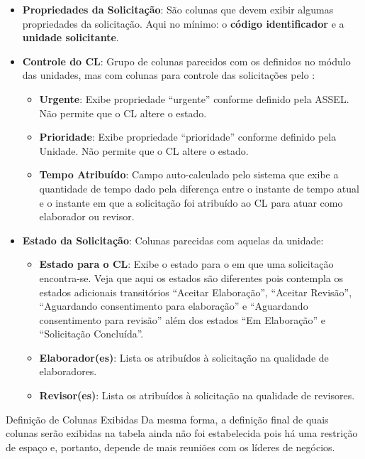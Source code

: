 \begin{itemize}
	\item \textbf{Propriedades da Solicitação}: São colunas que devem exibir algumas propriedades da solicitação. Aqui no mínimo: o \textbf{código identificador} e a \textbf{unidade solicitante}.
	
	
	\item \textbf{Controle do CL}: Grupo de colunas parecidos com os definidos no módulo das unidades, mas com colunas para controle das solicitações pelo \CL:
	
	\begin{itemize}
		\item \textbf{Urgente}: Exibe propriedade ``urgente'' conforme definido pela ASSEL. Não permite que o CL altere o estado. 
		
		\item \textbf{Prioridade}: Exibe propriedade ``prioridade'' conforme definido pela Unidade. Não permite que o CL altere o estado.
		
		\item \textbf{Tempo Atribuído}: Campo auto-calculado pelo sistema que exibe a quantidade de tempo dado pela diferença entre o instante de tempo atual e o instante em que a solicitação foi atribuído ao CL para atuar como elaborador ou revisor.
	\end{itemize}
	
	\item \textbf{Estado da Solicitação}: Colunas parecidas com aquelas da unidade:
	\begin{itemize}
		\item \textbf{Estado para o CL}: Exibe o estado para o \CL em que uma solicitação encontra-se. Veja que aqui os estados são diferentes pois contempla os estados adicionais transitórios ``Aceitar Elaboração'', ``Aceitar Revisão'', ``Aguardando consentimento para elaboração'' e ``Aguardando consentimento para revisão'' além dos estados ``Em Elaboração'' e ``Solicitação Concluída''.
		
		\item \textbf{Elaborador(es)}: Lista os \CLs atribuídos à solicitação na qualidade de elaboradores.
		
		\item \textbf{Revisor(es)}: Lista os \CLs atribuídos à solicitação na qualidade de revisores.
	\end{itemize}
\end{itemize}


\begin{nota}{Definição de Colunas Exibidas}
	Da mesma forma, a definição final de quais colunas serão exibidas na tabela ainda não foi estabelecida pois há uma restrição de espaço e, portanto, depende de mais reuniões com os líderes de negócios.
\end{nota}
